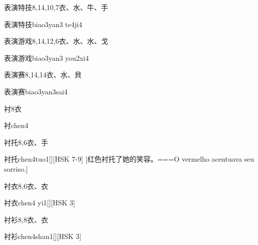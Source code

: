 \begin{Entry}{表演特技}{8,14,10,7}{⾐、⽔、⽜、⼿}
  \begin{Phonetics}{表演特技}{biao3yan3 te4ji4}
  \end{Phonetics}
\end{Entry}

\begin{Entry}{表演游戏}{8,14,12,6}{⾐、⽔、⽔、⼽}
  \begin{Phonetics}{表演游戏}{biao3yan3 you2xi4}
  \end{Phonetics}
\end{Entry}

\begin{Entry}{表演赛}{8,14,14}{⾐、⽔、⾙}
  \begin{Phonetics}{表演赛}{biao3yan3sai4}
  \end{Phonetics}
\end{Entry}

\begin{Entry}{衬}{8}{⾐}
  \begin{Phonetics}{衬}{chen4}
  \end{Phonetics}
\end{Entry}

\begin{Entry}{衬托}{8,6}{⾐、⼿}
  \begin{Phonetics}{衬托}{chen4tuo1}[][HSK 7-9]
    [红色衬托了她的笑容。===O vermelho acentuava seu sorriso.]
  \end{Phonetics}
\end{Entry}

\begin{Entry}{衬衣}{8,6}{⾐、⾐}
  \begin{Phonetics}{衬衣}{chen4 yi1}[][HSK 3]
  \end{Phonetics}
\end{Entry}

\begin{Entry}{衬衫}{8,8}{⾐、⾐}
  \begin{Phonetics}{衬衫}{chen4shan1}[][HSK 3]
  \end{Phonetics}
\end{Entry}

